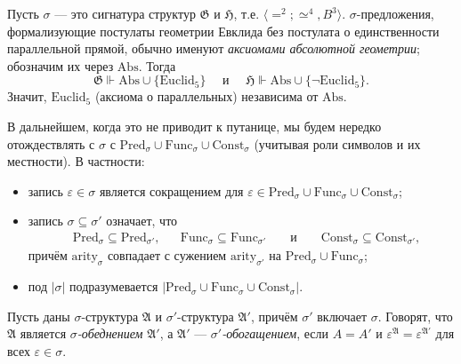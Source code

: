 \documentclass[12pt,a4paper]{article}
\newcommand{\Pred}{\ensuremath{\mathrm{Pred}}\xspace}
\newcommand{\Func}{\ensuremath{\mathrm{Func}}\xspace}
\newcommand{\Const}{\ensuremath{\mathrm{Const}}\xspace}
\newcommand{\arity}{\ensuremath{\mathrm{arity}}\xspace}
\newcommand{\Abs}{\ensuremath{\mathrm{Abs}}\xspace}
\begin{document}
    \begin{example}
        Пусть $\sigma$ --- это сигнатура структур \hyperlink{G-structure-definition}{$\mathfrak{G}$} и \hyperlink{H-structure-definition}{$\mathfrak{H}$}, т.е. $\langle {=}^2; {\simeq}^4, B^3 \rangle$. $\sigma$-пре\-дло\-же\-ния, формализующие постулаты геометрии Евклида без постулата о единственности параллельной прямой, обычно именуют \emph{аксиомами абсолютной геометрии}; обозначим их через $\Abs$. Тогда
        \[
            \mathfrak{G} \Vdash \Abs \cup \{\mathrm{Euclid}_5\}
            \quad \text{ и } \quad
            \mathfrak{H} \Vdash \Abs \cup \{\neg \mathrm{Euclid}_5\}.
        \]
        Значит, \hyperlink{Euclid_5-axiom-definition}{$\mathrm{Euclid}_5$} (аксиома о параллельных) независима от $\Abs$.
    \end{example}

    \begin{definition}
        В дальнейшем, когда это не приводит к путанице, мы будем нередко отождествлять с $\sigma$ с $\Pred_\sigma \cup \Func_\sigma \cup \Const_\sigma$ (учитывая роли символов и их местности). В частности:
        \begin{itemize}
            \item запись $\varepsilon \in \sigma$ является сокращением для $\varepsilon \in \Pred_\sigma \cup \Func_\sigma \cup \Const_\sigma$;
            \item запись $\sigma \subseteq \sigma'$ означает, что
                \begin{align*}
                    &\Pred_\sigma \subseteq \Pred_{\sigma'},&
                    &\Func_\sigma \subseteq \Func_{\sigma'}&
                    &\text{ и }&
                    &\Const_\sigma \subseteq \Const_{\sigma'},
                \end{align*}
                причём $\arity_\sigma$ совпадает с сужением $\arity_{\sigma'}$ на $\Pred_\sigma \cup \Func_\sigma$;
            \item под $|\sigma|$ подразумевается $|\Pred_\sigma \cup \Func_\sigma \cup \Const_\sigma|$.
        \end{itemize}

        Пусть даны $\sigma$-структура $\mathfrak{A}$ и $\sigma'$-структура $\mathfrak{A}'$, причём $\sigma'$ включает $\sigma$. Говорят, что $\mathfrak{A}$ является \emph{$\sigma$-обеднением} $\mathfrak{A}'$, а $\mathfrak{A}'$ --- \emph{$\sigma'$-обогащением}, если $A = A'$ и $\varepsilon^\mathfrak{A} = \varepsilon^{\mathfrak{A}'}$ для всех $\varepsilon \in \sigma$.
    \end{definition}
\end{document}
